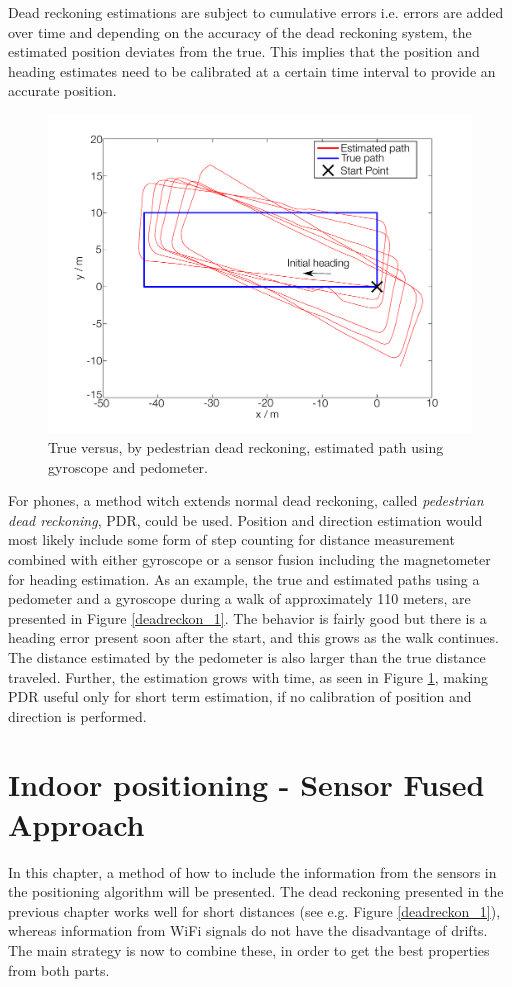 \documentclass{LTHthesis}
\begin{document}
Dead reckoning estimations are subject to cumulative errors i.e. errors are added over time and depending on the accuracy of the dead reckoning system, the estimated position deviates from the true. This implies that the position and heading estimates need to be calibrated at a certain time interval to provide an accurate position.
%
\begin{figure}[!hbt]

\includegraphics[width=1\textwidth ]{images/kinematic/deadreckon_2}
\caption{True versus, by pedestrian dead reckoning, estimated path using gyroscope and pedometer.}\label{deadreckon_2}
\end{figure}
%
For phones, a method witch extends normal dead reckoning, called \emph{pedestrian dead reckoning}, PDR, could be used. Position and direction estimation would most likely include some form of step counting for distance measurement combined with either gyroscope or a sensor fusion including the magnetometer for heading estimation. As an example, the true and estimated paths using a pedometer and a gyroscope during a walk of approximately 110 meters, are presented in Figure \ref{deadreckon_1}. The behavior is fairly good but there is a heading error present soon after the start, and this grows as the walk continues. The distance estimated by the pedometer is also larger than the true distance traveled. Further, the estimation grows with time, as seen in Figure \ref{deadreckon_2}, making PDR useful only for short term estimation, if no calibration of position and direction is performed.  
%
\chapter{Indoor positioning - Sensor Fused Approach} 
%
In this chapter, a method of how to include the information from the sensors in the positioning algorithm will be presented. The dead reckoning presented in the previous chapter works well for short distances (see e.g. Figure \ref{deadreckon_1}), whereas information from WiFi signals do not have the disadvantage of drifts. The main strategy is now to combine these, in order to get the best properties from both  parts.
\end{document}
